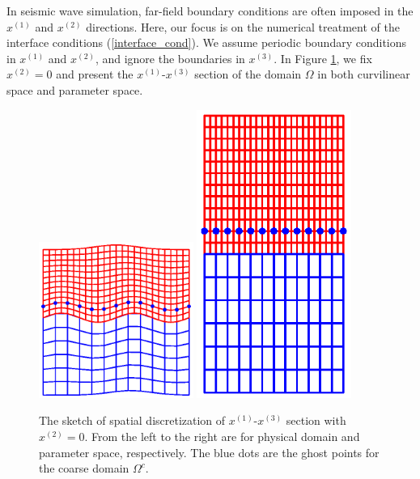 In seismic wave simulation, far-field boundary conditions are often imposed in the $x^{(1)}$ and $x^{(2)}$ directions. Here, our focus is on the numerical treatment of the interface conditions (\ref{interface_cond}). We assume periodic boundary conditions in $x^{(1)}$ and $x^{(2)}$, and ignore the boundaries in $x^{(3)}$. In Figure \ref{section_discretization}, we fix $x^{(2)} = 0$ and present the $x^{(1)}$-$x^{(3)}$ section of the domain $\Omega$ in both curvilinear space and parameter space.
\begin{figure}[htbp]
	\centering
	\includegraphics[width=0.45\textwidth,trim={1.0cm 2.0cm 1.0cm 1.8cm}, clip]{physical_section_discretization.eps}
	\includegraphics[width=0.45\textwidth,trim={1.0cm 2.0cm 1cm 1.8cm}, clip]{parameter_section_discretization.eps}
	\caption{The sketch of spatial discretization of $x^{(1)}$-$x^{(3)}$ section with $x^{(2)} = 0$. From the left to the right are for physical domain and parameter space, respectively. The blue dots are the ghost points for the coarse domain $\Omega^c$.}\label{section_discretization}
\end{figure}
